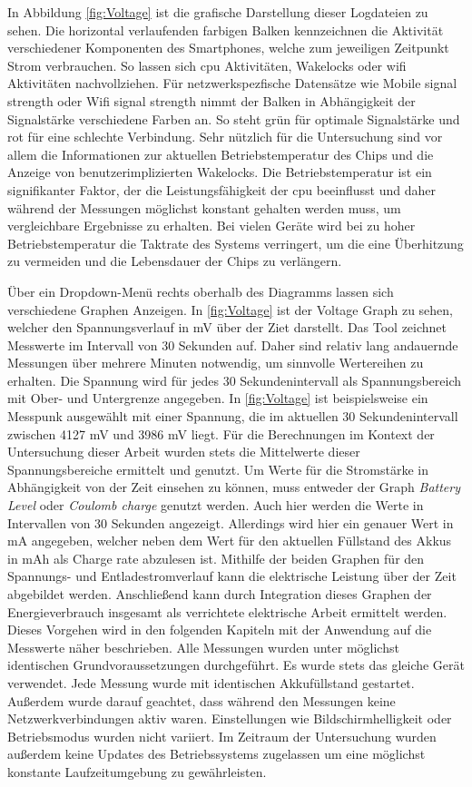 In Abbildung \ref{fig:Voltage} ist die grafische Darstellung dieser Logdateien zu sehen. Die horizontal verlaufenden farbigen Balken kennzeichnen die Aktivität verschiedener Komponenten des Smartphones, welche zum jeweiligen Zeitpunkt Strom verbrauchen. So lassen sich \ac{cpu} Aktivitäten, Wakelocks oder \ac{wifi} Aktivitäten nachvollziehen. Für netzwerkspezfische Datensätze wie \glqq Mobile signal strength\grqq{} oder \glqq Wifi signal strength\grqq{} nimmt der Balken in Abhängigkeit der Signalstärke verschiedene Farben an. So steht grün für optimale Signalstärke und rot für eine schlechte Verbindung. Sehr nützlich für die Untersuchung sind vor allem die Informationen zur aktuellen Betriebstemperatur des Chips und die Anzeige von benutzerimplizierten Wakelocks. Die Betriebstemperatur ist ein signifikanter Faktor, der die Leistungsfähigkeit der \ac{cpu} beeinflusst und daher während der Messungen möglichst konstant gehalten werden muss, um vergleichbare Ergebnisse zu erhalten. Bei vielen Geräte wird bei zu hoher Betriebstemperatur die Taktrate des Systems verringert, um die eine Überhitzung zu vermeiden und die Lebensdauer der Chips zu verlängern.

Über ein Dropdown-Menü rechts oberhalb des Diagramms lassen sich verschiedene Graphen Anzeigen. In \autoref{fig:Voltage} ist der Voltage Graph zu sehen, welcher den Spannungsverlauf in \ac{mV} über der Ziet darstellt. Das Tool zeichnet Messwerte im Intervall von 30 Sekunden auf. Daher sind relativ lang andauernde Messungen über mehrere Minuten notwendig, um sinnvolle Wertereihen zu erhalten. Die Spannung wird für jedes 30 Sekundenintervall als Spannungsbereich mit Ober- und Untergrenze angegeben. In \autoref{fig:Voltage} ist beispielsweise ein Messpunk ausgewählt mit einer Spannung, die im aktuellen 30 Sekundenintervall zwischen 4127 \ac{mV} und 3986 \ac{mV} liegt. Für die Berechnungen im Kontext der Untersuchung dieser Arbeit wurden stets die Mittelwerte dieser Spannungsbereiche ermittelt und genutzt. Um Werte für die Stromstärke in Abhängigkeit von der Zeit einsehen zu können, muss entweder der Graph \emph{Battery Level} oder \emph{Coulomb charge} genutzt werden. Auch hier werden die Werte in Intervallen von 30 Sekunden angezeigt. Allerdings wird hier ein genauer Wert in \ac{mA} angegeben, welcher neben dem Wert für den aktuellen Füllstand des Akkus in \ac{mAh} als \glqq Charge rate\grqq{} abzulesen ist. Mithilfe der beiden Graphen für den Spannungs- und Entladestromverlauf kann die elektrische Leistung über der Zeit abgebildet werden. Anschließend kann durch Integration dieses Graphen der Energieverbrauch insgesamt als verrichtete elektrische Arbeit ermittelt werden. Dieses Vorgehen wird in den folgenden Kapiteln mit der Anwendung auf die Messwerte näher beschrieben. Alle Messungen wurden unter möglichst identischen Grundvoraussetzungen durchgeführt. Es wurde stets das gleiche Gerät verwendet. Jede Messung wurde mit identischen Akkufüllstand gestartet. Außerdem wurde darauf geachtet, dass während den Messungen keine Netzwerkverbindungen aktiv waren. Einstellungen wie Bildschirmhelligkeit oder Betriebsmodus wurden nicht variiert. Im Zeitraum der Untersuchung wurden außerdem keine Updates des Betriebssystems zugelassen um eine möglichst konstante Laufzeitumgebung zu gewährleisten.

